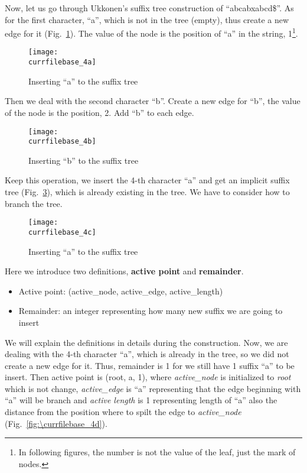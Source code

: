 \documentclass[catalog.tex]{subfiles}
\begin{document}
		Now, let us go through Ukkonen's suffix tree construction of ``abcabxabcd\$''. As for the first character, ``a'', which is not in the tree (empty), thus create a new edge for it (Fig.~\ref{fig:\currfilebase_4a}). The value of the node is the position of ``a'' in the string, 1\footnote{In following figures, the number is not the value of the leaf, just the mark of nodes.}.


		\begin{figure}[!htb]
			\centering
			\texttt{[image: \\currfilebase\_4a]}
			\caption{Inserting ``a'' to the suffix tree\cite{UkkonenAnimation}}
			\label{fig:\currfilebase_4a}
		\end{figure}


		Then we deal with the second character ``b''. Create a new edge for ``b'', the value of the node is the position, 2. Add ``b'' to each edge.


		\begin{figure}[!htb]
			\centering
			\texttt{[image: \\currfilebase\_4b]}
			\caption{Inserting ``b'' to the suffix tree\cite{UkkonenAnimation}}
			\label{fig:\currfilebase_4b}
		\end{figure}


		Keep this operation, we insert the 4-th character ``a'' and get an implicit suffix tree (Fig.~\ref{fig:\currfilebase_4c}), which is already existing in the tree. We have to consider how to branch the tree.


		\begin{figure}[!htb]
			\centering
			\texttt{[image: \\currfilebase\_4c]}
			\caption{Inserting ``a'' to the suffix tree\cite{UkkonenAnimation}}
			\label{fig:\currfilebase_4c}
		\end{figure}

		Here we introduce two definitions, {\bf active point} and {\bf remainder}.
		\begin{itemize}
			\item Active point: (active\_node, active\_edge, active\_length)
			\item Remainder: an integer representing how many new suffix we are going to insert
		\end{itemize}
		We will explain the definitions in details during the construction. Now, we are dealing with the 4-th character ``a'', which is already in the tree, so we did not create a new edge for it. Thus, remainder is 1 for we still have 1 suffix ``a'' to be insert. Then active point is (root, a, 1), where {\it active\_node} is initialized to {\it root} which is not change, {\it active\_edge} is ``a'' representing that the edge beginning with ``a'' will be branch and {\it active length} is 1 representing length of ``a'' also the distance from the position where to spilt the edge to {\it active\_node} (Fig.~\ref{fig:\currfilebase_4d}).
\end{document}
